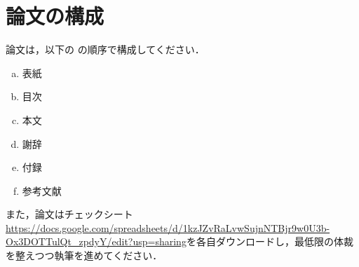 
\chapter{論文の構成}\label{chap:論文の構成}

論文は，以下の の順序で構成してください．

	\begin{enumerate}[a.]
		\item 表紙 \label{term:a}
		\item 目次 \label{term:b}
		\item 本文 \label{term:c}
		\item 謝辞 \label{term:d}
		\item 付録 \label{term:e}
		\item 参考文献 \label{term:f}
	\end{enumerate}

また，論文はチェックシート\url{https://docs.google.com/spreadsheets/d/1kzJZvRaLvwSujnNTBjr9w0U3b-Ox3DOTTulQt_zpdyY/edit?usp=sharing}を各自ダウンロードし，最低限の体裁を整えつつ執筆を進めてください．